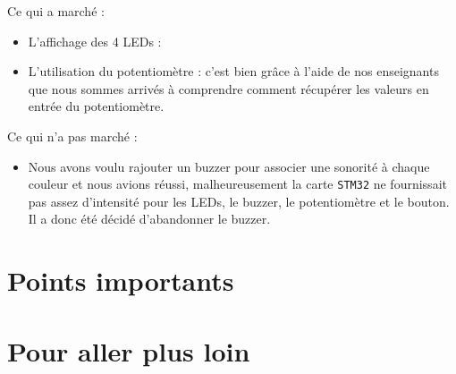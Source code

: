\documentclass[10pt,a4,french]{article}
\begin{document}
Ce qui a marché :

\begin{itemize}
	\item L'affichage des 4 LEDs : 
	\item L'utilisation du potentiomètre : c'est bien grâce à l'aide de nos enseignants que nous sommes arrivés à comprendre comment récupérer les valeurs en entrée du potentiomètre.
\end{itemize}

Ce qui n'a pas marché :

\begin{itemize}
	\item Nous avons voulu rajouter un buzzer pour associer une sonorité à chaque couleur et nous avions réussi,
		malheureusement la carte \texttt{STM32} ne fournissait pas assez d'intensité pour les LEDs, le buzzer, le potentiomètre et le bouton.
		Il a donc été décidé d'abandonner le buzzer.
\end{itemize}

\section{Points importants}

\section{Pour aller plus loin}
\end{document}

